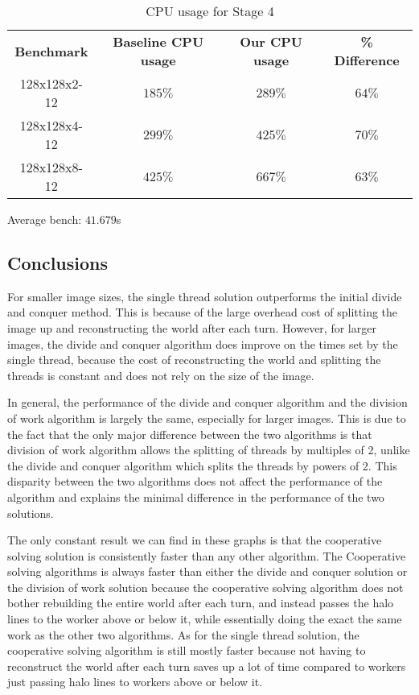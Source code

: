 \documentclass[11pt,a4paper,dvipsnames,cmyk]{scrartcl}
\begin{document}
\begin{table}[ht]
\caption{CPU usage for Stage 4}
\begin{center}
    \begin{tabular}{|c|c|c|c|}
        \hline
        \textbf{Benchmark} & \textbf{Baseline CPU usage} &
        \textbf{Our CPU usage} & \textbf{\% Difference} \\ \hhline{|=|=|=|=|}
        128x128x2-12 & $185\%$ & $289\%$ & $64\%$ \\ \hline
        128x128x4-12 & $299\%$ & $425\%$ & $70\%$ \\ \hline
        128x128x8-12 & $425\%$ & $667\%$ & $63\%$ \\ \hline
    \end{tabular}
\end{center}
\end{table}



Average bench: $41.679$s

\subsection*{Conclusions}%
\label{sub:Conclusions}
For smaller image sizes, the single thread solution outperforms the
initial divide and conquer method. This is because of the large overhead
cost of splitting the image up and reconstructing the world after each
turn.  However, for larger images, the divide and conquer algorithm does
improve on the times set by the single thread, because the cost of
reconstructing the world and splitting the threads is constant and does
not rely on the size of the image.

In general, the performance of the divide and conquer algorithm and the
division of work algorithm is largely the same, especially for larger
images. This is due to the fact that the only major difference between the
two algorithms is that division of work algorithm allows the splitting of
threads by multiples of 2, unlike the divide and conquer algorithm which
splits the threads by powers of 2. This disparity between the two algorithms
does not affect the performance of the algorithm and explains the minimal
difference in the performance of the two solutions.

The only constant result we can find in these graphs is that the cooperative
solving solution is consistently faster than any other algorithm. The
Cooperative solving algorithms is always faster than either the divide and
conquer solution or the division of work solution because the cooperative
solving algorithm does not bother rebuilding the entire world after each
turn, and instead passes the halo lines to the worker above or below it,
while essentially doing the exact the same work as the other two algorithms.
As for the single thread solution, the cooperative solving algorithm is
still mostly faster because not having to reconstruct the world after each
turn saves up a lot of time compared to workers just passing halo lines to
workers above or below it.
\end{document}
